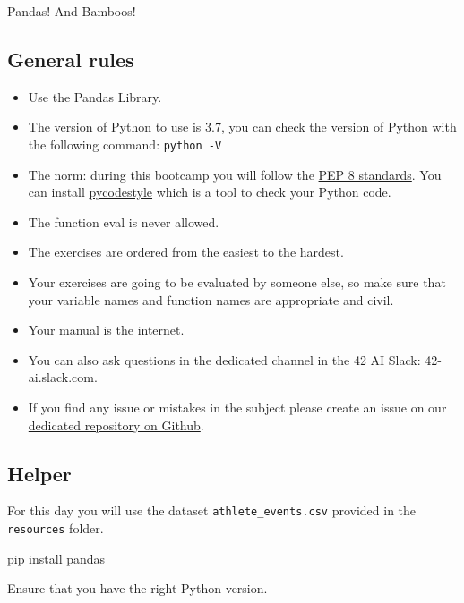 \documentclass[]{article}
\newenvironment{Shaded}{\begin{snugshade}}{\end{snugshade}}
\newcommand{\NormalTok}[1]{\textcolor[rgb]{0.81,0.81,0.76}{#1}}
\begin{document}
Pandas! And Bamboos!

\hypertarget{general-rules}{%
\subsection{General rules}\label{general-rules}}

\begin{itemize}
\item
  Use the Pandas Library.
\item
  The version of Python to use is 3.7, you can check the version of
  Python with the following command: \texttt{python\ -V}
\item
  The norm: during this bootcamp you will follow the
  \href{https://www.python.org/dev/peps/pep-0008/}{PEP 8 standards}. You
  can install \href{https://pypi.org/project/pycodestyle}{pycodestyle}
  which is a tool to check your Python code.
\item
  The function eval is never allowed.
\item
  The exercises are ordered from the easiest to the hardest.
\item
  Your exercises are going to be evaluated by someone else, so make sure
  that your variable names and function names are appropriate and civil.
\item
  Your manual is the internet.
\item
  You can also ask questions in the dedicated channel in the 42 AI
  Slack: 42-ai.slack.com.
\item
  If you find any issue or mistakes in the subject please create an
  issue on our
  \href{https://github.com/42-AI/bootcamp_python/issues}{dedicated
  repository on Github}.
\end{itemize}

\hypertarget{helper}{%
\subsection{Helper}\label{helper}}

For this day you will use the dataset \texttt{athlete\_events.csv}
provided in the \texttt{resources} folder.

\begin{Shaded}
\begin{Highlighting}[]
\NormalTok{pip install pandas}
\end{Highlighting}
\end{Shaded}

Ensure that you have the right Python version.
\end{document}

